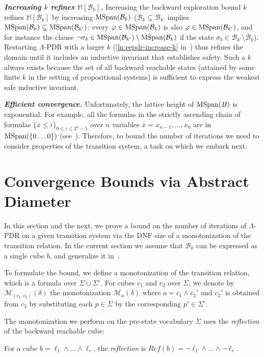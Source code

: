 \documentclass[acmsmall,screen]{acmart}
\newcommand{\para}[1]{\vspace{2pt}\noindent\textbf{\textit{#1.}}}
\newcommand{\ov}{\overline}
\newcommand{\vocabulary}{\Sigma}
\newcommand{\voc}{\vocabulary}
\newcommand{\tr}{\delta}
\renewcommand{\vec}{\ov}
\newcommand{\set}[1]{\{{#1}\}}
\newcommand{\bkwrch}[1]{\mathcal{B}_{#1}}
\newcommand{\monox}[2]{\mathcal{M}_{#2}({#1})}
\newcommand{\mspan}[1]{{\rm MSpan}({#1})}
\newcommand{\bkwspan}[1]{\mspan{\bkwrch{#1}}}
\newcommand{\madom}[1]{\mathbb{M}[{#1}]}
\newcommand{\bkcube}{b}
\newcommand{\reflect}[1]{\textit{Ref}({#1})}
\begin{document}
\para{Increasing $k$ refines $\madom{\bkwrch{k}}$}
Increasing the backward exploration bound $k$ refines $\madom{\bkwrch{k}}$ by increasing $\bkwspan{k}$ ($\bkwrch{k} \subsetneq \bkwrch{k'}$ implies $\bkwspan{k} \subsetneq \bkwspan{k'}$: every $\varphi \in \bkwspan{k}$ is also $\varphi \in \bkwspan{k'}$, and for instance the clause $\neg \sigma_b \in \bkwspan{k'} \setminus \bkwspan{k}$ %
if the state
$\sigma_b \in \bkwrch{k'} \setminus \bkwrch{k}$). %
Restarting $\Lambda$-PDR with a larger $k$ (\cref{ln:eepdr-increase-k} in~)
%
thus refines the domain until it includes an inductive invariant that establishes safety. Such a $k$ always exists because the set of all backward reachable states (attained by some finite $k$ in the setting of propositional systems) is sufficient to express the weakest safe inductive invariant.

\para{Efficient convergence}
Unfortunately, the lattice height of $\mspan{B}$ is exponential. For example, all the formulas in the strictly ascending chain of formulas $\set{\vec{x} \leq i}_{0 \leq i \leq 2^n-1}$ over $n$ variables $\vec{x}=x_{n-1},\ldots,x_0$ are in $\mspan{\set{0\ldots0}}$ (see~).
Therefore, to bound the number of iterations we need to consider properties of the transition system, a task on which we embark next.  
%
\section{Convergence Bounds via Abstract Diameter}
\label{sec:abstract-diameter-all}
In this section and the next, we prove a bound on the number of iterations of $\Lambda$-PDR on a given transition system via the DNF size of a monotonization of the transition relation.
In the current section we assume that $\bkwrch{k}$ can be expressed as a single cube $\bkcube$, and generalize it in~.

To formulate the bound, we define a monotonization of the transition relation, which is a formula over $\voc \cup \voc'$. For cubes $c_1$ and $c_2$ over $\voc$, we denote by $\monox{\tr}{(c_1,c_2)}$ the monotonization $\monox{\tr}{a}$ where $a = c_1 \land c_2'$ and $c_2'$ is obtained from $c_2$ by substituting each $p \in \voc$ by the corresponding $p' \in \voc'$.

The monotonization we perform on the pre-state vocabulary $\voc$ uses the \emph{reflection} of the backward reachable cube:
\begin{definition}[Reflection]
For a cube $\bkcube = \ell_1 \land \ldots \land \ell_r$, the \emph{reflection} is $\reflect{\bkcube} = \neg \ell_1 \land \ldots \land \neg \ell_r$.
\end{definition}
\end{document}
